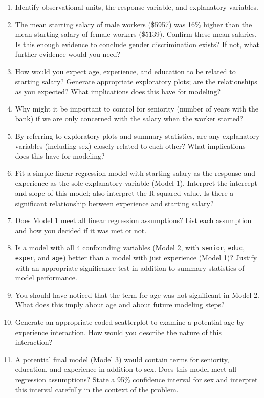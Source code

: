 \documentclass[
]{krantz}
\providecommand{\tightlist}{%
  \setlength{\itemsep}{0pt}\setlength{\parskip}{0pt}}
\begin{document}
\begin{enumerate}
  \begin{enumerate}
  \def\labelenumii{\alph{enumii}.}
  \tightlist
  \item
    Identify observational units, the response variable, and explanatory variables.
  \item
    The mean starting salary of male workers (\$5957) was 16\% higher than the mean starting salary of female workers (\$5139). Confirm these mean salaries. Is this enough evidence to conclude gender discrimination exists? If not, what further evidence would you need?
  \item
    How would you expect age, experience, and education to be related to starting salary? Generate appropriate exploratory plots; are the relationships as you expected? What implications does this have for modeling?
  \item
    Why might it be important to control for seniority (number of years with the bank) if we are only concerned with the salary when the worker started?
  \item
    By referring to exploratory plots and summary statistics, are any explanatory variables (including sex) closely related to each other? What implications does this have for modeling?
  \item
    Fit a simple linear regression model with starting salary as the response and experience as the sole explanatory variable (Model 1). Interpret the intercept and slope of this model; also interpret the R-squared value. Is there a significant relationship between experience and starting salary?\\
  \item
    Does Model 1 meet all linear regression assumptions? List each assumption and how you decided if it was met or not.
  \item
    Is a model with all 4 confounding variables (Model 2, with \texttt{senior}, \texttt{educ}, \texttt{exper}, and \texttt{age}) better than a model with just experience (Model 1)? Justify with an appropriate significance test in addition to summary statistics of model performance.
  \item
    You should have noticed that the term for age was not significant in Model 2. What does this imply about age and about future modeling steps?
  \item
    Generate an appropriate coded scatterplot to examine a potential age-by-experience interaction. How would you describe the nature of this interaction?
  \item
    A potential final model (Model 3) would contain terms for seniority, education, and experience in addition to sex. Does this model meet all regression assumptions? State a 95\% confidence interval for sex and interpret this interval carefully in the context of the problem.

\end{enumerate}
\end{enumerate}
\end{document}
